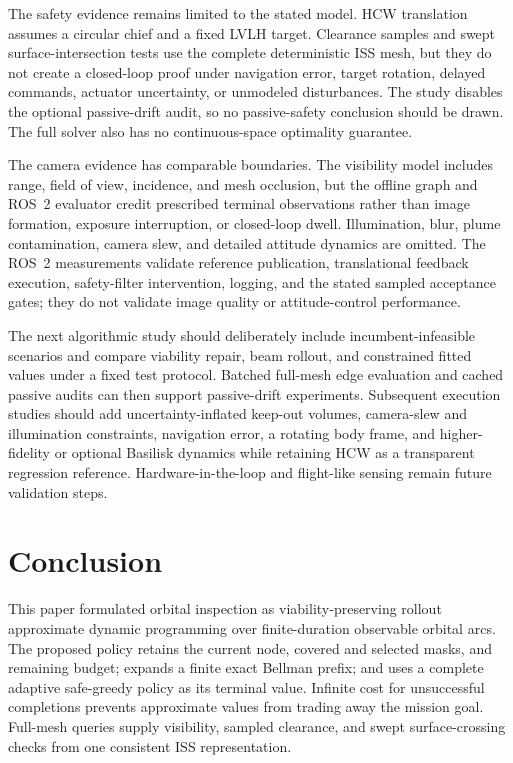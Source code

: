 \documentclass{IEEEtaes}
\theoremstyle{remark}
\theoremstyle{plain}
\begin{document}
The safety evidence remains limited to the stated model. HCW translation assumes a circular chief and a fixed LVLH target. Clearance samples and swept surface-intersection tests use the complete deterministic ISS mesh, but they do not create a closed-loop proof under navigation error, target rotation, delayed commands, actuator uncertainty, or unmodeled disturbances. The study disables the optional passive-drift audit, so no passive-safety conclusion should be drawn. The full solver also has no continuous-space optimality guarantee.

The camera evidence has comparable boundaries. The visibility model includes range, field of view, incidence, and mesh occlusion, but the offline graph and ROS~2 evaluator credit prescribed terminal observations rather than image formation, exposure interruption, or closed-loop dwell. Illumination, blur, plume contamination, camera slew, and detailed attitude dynamics are omitted. The ROS~2 measurements validate reference publication, translational feedback execution, safety-filter intervention, logging, and the stated sampled acceptance gates; they do not validate image quality or attitude-control performance.

The next algorithmic study should deliberately include incumbent-infeasible scenarios and compare viability repair, beam rollout, and constrained fitted values under a fixed test protocol. Batched full-mesh edge evaluation and cached passive audits can then support passive-drift experiments. Subsequent execution studies should add uncertainty-inflated keep-out volumes, camera-slew and illumination constraints, navigation error, a rotating body frame, and higher-fidelity or optional Basilisk dynamics while retaining HCW as a transparent regression reference. Hardware-in-the-loop and flight-like sensing remain future validation steps.

\section{Conclusion}
\label{sec:conclusion}

This paper formulated orbital inspection as viability-preserving rollout approximate dynamic programming over finite-duration observable orbital arcs. The proposed policy retains the current node, covered and selected masks, and remaining budget; expands a finite exact Bellman prefix; and uses a complete adaptive safe-greedy policy as its terminal value. Infinite cost for unsuccessful completions prevents approximate values from trading away the mission goal. Full-mesh queries supply visibility, sampled clearance, and swept surface-crossing checks from one consistent ISS representation.
\end{document}
